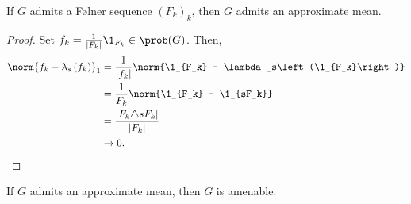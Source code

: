 \begin{proposition}\label{prop:folner_implies_approx_mean}
  If $G$ admits a Følner sequence $\left(F_k\right)_k$, then $G$ admits an approximate mean.
\end{proposition}
\begin{proof}
  Set $f_k = \frac{1}{\left\vert F_k \right\vert}\1_{F_k}\in \prob(G)$. Then,
  \begin{align*}
    \norm{f_k - \lambda_s\left(f_k\right)}_{1} &= \frac{1}{\left\vert f_k \right\vert} \norm{\1_{F_k} - \lambda_s\left(\1_{F_k}\right)}\\
                                               &= \frac{1}{F_k}\norm{\1_{F_k} - \1_{sF_k}}\\
                                               &= \frac{\left\vert F_k\triangle sF_k \right\vert}{\left\vert F_k \right\vert}\\
                                               &\rightarrow 0.
  \end{align*}
\end{proof}
\begin{proposition}\label{prop:approx_mean_implies_amenable}
  If $G$ admits an approximate mean, then $G$ is amenable.
\end{proposition}
